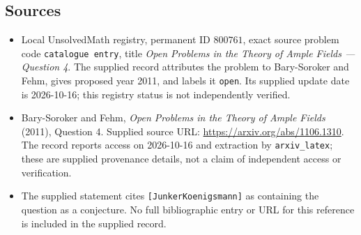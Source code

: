 \documentclass[11pt]{article}
\begin{document}
\subsection{Sources}
\begin{itemize}
\item Local UnsolvedMath registry, permanent ID \(800761\), exact source problem code \texttt{catalogue entry}, title \emph{Open Problems in the Theory of Ample Fields --- Question 4}. The supplied record attributes the problem to Bary-Soroker and Fehm, gives proposed year 2011, and labels it \texttt{open}. Its supplied update date is 2026-10-16; this registry status is not independently verified.
\item Bary-Soroker and Fehm, \emph{Open Problems in the Theory of Ample Fields} (2011), Question 4. Supplied source URL: \url{https://arxiv.org/abs/1106.1310}. The record reports access on 2026-10-16 and extraction by \texttt{arxiv\_latex}; these are supplied provenance details, not a claim of independent access or verification.
\item The supplied statement cites \texttt{[JunkerKoenigsmann]} as containing the question as a conjecture. No full bibliographic entry or URL for this reference is included in the supplied record.
\end{itemize}
\end{document}
